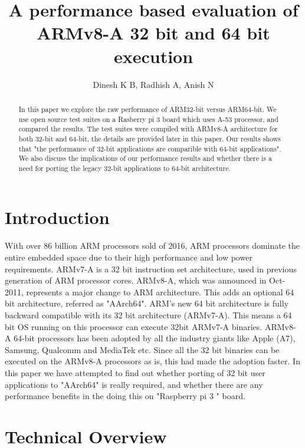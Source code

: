 \documentclass[journal]{IEEEtran}
\begin{document}
\title{A performance based evaluation of ARMv8-A 32 bit and 64 bit execution}
\author{Dinesh K B, Radhish A, Anish N}

\maketitle

\begin{abstract}
In this paper we explore the raw performance of ARM32-bit versus ARM64-bit.  We use open source test suites on a Rasberry pi 3 board which uses A-53 processor, and compared the results.  The test suites were compiled with ARMv8-A architecture for both 32-bit and 64-bit, the details are provided later in this paper.  Our results shows that "the performance of 32-bit applications are comparible with 64-bit applications".  We also discuss the implications of our performance results and whether there is a need for porting the legacy 32-bit applications to 64-bit architecture.
\end{abstract}

\section{Introduction}
With over 86 billion ARM processors sold of 2016, ARM processors dominate the entire embedded space due to their high performance and low power requirements.  ARMv7-A is a 32 bit instruction set architecture, used in previous generation of ARM processor cores.  ARMv8-A, which was announced in Oct-2011, represents a major change to ARM architecture.  This adds an optional 64 bit architecture, referred as "AArch64". ARM's new 64 bit architecture is fully backward compatible with its 32 bit architecture (ARMv7-A). This means a 64 bit OS running on this processor can execute 32bit ARMv7-A binaries.  ARMv8-A 64-bit processors has been adopted by all the industry giants like Apple (A7), Samsung, Qualcomm and MediaTek etc.  Since all the 32 bit binaries can be executed on the ARMv8-A processors as is, this had made the adoption faster.  In this paper we have attempted to find out whether porting of 32 bit user applications to "AArch64" is really required, and whether there are any performance benefits in the doing this on "Raspberry pi 3 " board.

\section{Technical Overview}
\end{document}
